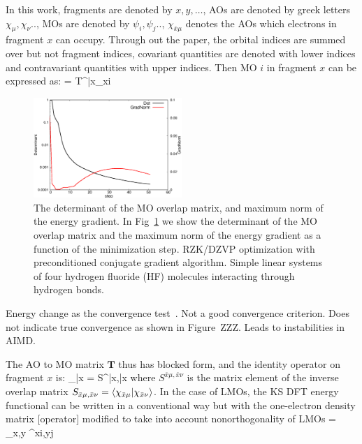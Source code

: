 \documentclass[aps,prl,twocolumn,reprint,amsmath,amssymb]{revtex4-1}
\begin{document}
In this work, fragments are denoted by $x,y,\ldots$, AOs are denoted by greek letters $\chi_\mu,\chi_\nu ..$, MOs are denoted by $\psi_i,\psi_j..$, $\chi_{\bar{x}\mu}$ denotes the AOs which electrons in fragment $x$ can occupy. Through out the paper, the orbital indices are summed over but not fragment indices, covariant quantities are denoted with lower indices and contravariant quantities with upper indices. Then MO $i$ in fragment $x$ can be expressed as:
\bea
{} =  {T^{\bar{x}\mu}}_{xi}
\label{eq:LMO}
\eea

\begin{figure}
\includegraphics[width=0.5\textwidth]{det}
\caption{
The determinant of the MO overlap matrix, and maximum norm of the energy gradient. In Fig~\ref{fig:det} we show the determinant of the MO overlap matrix and the maximum norm of the energy gradient as a function of the minimization step. RZK/DZVP optimization with preconditioned conjugate gradient algorithm. Simple linear systems of four hydrogen fluoride (HF) molecules interacting through hydrogen bonds.}
\label{fig:det}
\end{figure}

Energy change as the convergence test~\cite{fattebert2000towards, kim1995total, ordejon1995linear}. Not a good convergence criterion. Does not indicate true convergence as shown in Figure~ZZZ. Leads to instabilities in AIMD.


The AO to MO matrix $\mathbf{T}$ thus has blocked form, and the identity operator on fragment $x$ is:
%
\bea
{}_{\bar{x}} =  S^{\bar{x}\mu,\bar{x}\nu} 
\eea
%
where $S^{\bar{x}\mu,\bar{x}\nu}$ is the matrix element of the inverse overlap matrix $S_{\bar{x}\mu,\bar{x}\nu} = \langle  \chi_{\bar{x}\mu} \vert  \chi_{\bar{x}\nu} \rangle $. In the case of LMOs, the KS DFT energy functional can be written in a conventional way but with the one-electron density matrix [operator] modified to take into account nonorthogonality of LMOs
\bea \label{eq:dm}
 = \sum_{x,y}  \sigma^{xi,yj} 
\eea
%
\end{document}
